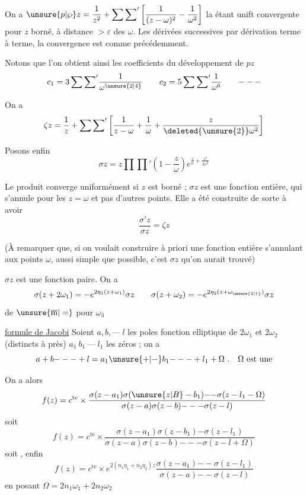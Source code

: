 On a  $\displaystyle\unsure{p|\wp}z=\frac1{z^2}+\sum{\sum}'\left[\frac1{(z-\omega)^2}-\frac1{\omega^2}\right]$ la  étant unift convergente pour $z$ borné, à distance $>\varepsilon$ des $\omega$. Les dérivées successives  par dérivation terme à terme, la convergence est comme précédemment.

Notons que l'on obtient ainsi les coefficients du développement de $pz$
\[
c_1=3\sum{\sum}'\frac1{\omega^{\unsure{2|4}}}\qquad c_2=5\sum{\sum}'\frac1{\omega^6}\qquad\mathord{---}
\]

On a
\[
\zeta z=\frac1z+\sum{\sum}'\left[\frac1{z-\omega}+\frac1\omega+\frac{z}{\deleted{\unsure{2}}\omega^2}\right]
\]

Posons enfin
\[
\sigma z=z\prod{\prod}'\left(1-\frac z\omega\right)e^{\frac z\omega+\frac{z^2}{2\omega^2}}
\]

Le produit converge  uniformément  si $z$ est borné ; $\sigma z$ est une fonction entière, qui s'annule pour les $z=\omega$ et pas d'autres points. Elle a été construite de sorte à avoir
\[
\frac{\sigma'z}{\sigma z}=\zeta z
\]

(À remarquer que, si on voulait construire à priori une fonction entière s'annulant aux points $\omega$, aussi simple que possible, c'est $\sigma z$ qu'on aurait trouvé)

$\sigma z$ est une fonction paire. On a
\[
\sigma(z+2\omega_1)=-e^{2\eta_1(z+\omega_1)}\sigma z\qquad
\sigma(z+\omega_2)=-e^{2\eta_2(z+\omega_{\unsure{2|1}})}\sigma z
\]
de $\unsure{\overline{\mathrm m}|=}$ pour $\omega_3$

\uline{formule de Jacobi} Soient $a,b,\mathord{\text{---}}\ l$ les poles   fonction elliptique de  $2\omega_1$ et $2\omega_2$ (distincts à \unsure{$2\omega$|$1\omega$} près) $a_1\ b_1\ \mathord{\text{---}}\ l_1$ les zéros ; on a
\[
a+b\mathord{---}+l=a_1\unsure{+|-}b_1\mathord{---}+l_1+\Omega\ .\quad \Omega\ \text{est une}
\]

On a alors
\[
f(z)=c^{\mathrm{te}}\times\frac{\sigma(z-a_1)\sigma(\unsure{z|B}-b_1)\mathord{--}\sigma(z-l_1-\Omega)}
{\sigma(z-a)\sigma(z-b)\mathord{---}\sigma(z-l)}
\]
soit
\[
f(z)=c^{\mathrm{te}}\times\frac{\sigma(z-a_1)\sigma(z-b_1)\mathord{-}\sigma(z-l_1)}
{\sigma(z-a)\sigma(z-b)\mathord{---}\sigma(z-l+\Omega)}
\]
soit , enfin
\[
f(z)=c^{\mathrm{te}}\times e^{2(n_1\eta_1+n_2\eta_2)z}
\frac{\sigma(z-a_1)\mathord{--}\sigma(z-l_1)}{\sigma(z-a)\mathord{--}\sigma(z-l)}
\]
en posant $\Omega=2n_1\omega_1+2n_2\omega_2$

